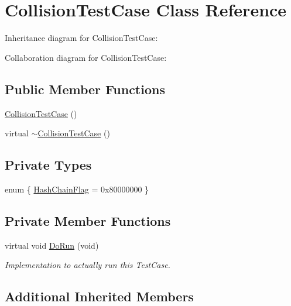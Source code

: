 \hypertarget{classCollisionTestCase}{}\section{Collision\+Test\+Case Class Reference}
\label{classCollisionTestCase}


Inheritance diagram for Collision\+Test\+Case\+:


Collaboration diagram for Collision\+Test\+Case\+:
\subsection*{Public Member Functions}
\begin{DoxyCompactItemize}
\item 
\hyperlink{classCollisionTestCase_af8f93e4551747ed3fce51fb38f6761f1}{Collision\+Test\+Case} ()
\item 
virtual \hyperlink{classCollisionTestCase_a31447b3d4f615b5c0b2e13da0acb0bd6}{$\sim$\+Collision\+Test\+Case} ()
\end{DoxyCompactItemize}
\subsection*{Private Types}
\begin{DoxyCompactItemize}
\item 
enum \{ \hyperlink{classCollisionTestCase_a548cc857844db44014bb02d25b46008ea91195d2ad8d7721b7e17cb95bbd76be5}{Hash\+Chain\+Flag} = 0x80000000
 \}
\end{DoxyCompactItemize}
\subsection*{Private Member Functions}
\begin{DoxyCompactItemize}
\item 
virtual void \hyperlink{classCollisionTestCase_abf633ca113f16977e476e119a5754fab}{Do\+Run} (void)
\begin{DoxyCompactList}\small\item\em Implementation to actually run this Test\+Case. \end{DoxyCompactList}\end{DoxyCompactItemize}
\subsection*{Additional Inherited Members}


